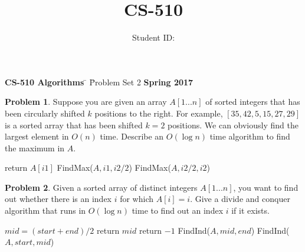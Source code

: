 \documentclass{article}
\title{CS-510 \hwNo}
\author{\myname \qquad Student ID: \myid}
\theoremstyle{definition}
\newtheorem{Q}{Problem}
\begin{document}
\maketitle
\begin{tabbing}


{\bf CS-510 Algorithms}   \= \hskip1.4in \= Problem Set 2 \` {\bf Spring 2017} \kill 
\end{tabbing}
\begin{Q}
Suppose you are given an array $A[1...n]$ of sorted integers that has been circularly shifted $k$ positions to the right. For example, $[35,42,5,15,27,29]$ is a sorted array that has been shifted $k = 2$ positions. We can obviously find the largest element in $O(n)$ time. Describe an $O(\log n)$ time algorithm to find the maximum in $A$. 
\end{Q}

\begin{algorithm}
\caption{}\label{}
\begin{algorithmic}

  \State return $A[i1]$
  \Else
    \State 
        \State FindMax($A,i1,i2/2$)
     \Else
        \State FindMax($A,i2/2,i2$)
    \EndIf
    
    \EndIf

\EndProcedure
\end{algorithmic}
\end{algorithm}

	\pagebreak
\begin{Q}
Given a sorted array of distinct integers $A[1...n]$, you want to find out whether there is an index $i$ for which $A[i] = i$. Give a divide and conquer algorithm that runs in $O(\log n)$ time to find out an index $i$ if it exists.
\end{Q}
\begin{algorithm}
\caption{}\label{}
\begin{algorithmic}

  \State $mid =  (start+end)/2$
  \State
        \State return $mid$
      \Else
       \State return $-1$
       \EndIf
  \Else
        \State FindInd($A,mid,end$)
     \Else
        \State FindInd($A,start,mid$)
    \EndIf
    \EndIf
    


\EndProcedure
\end{algorithmic}
\end{algorithm}
\end{document}

